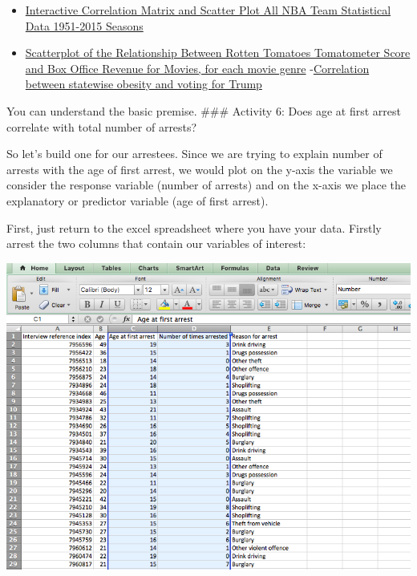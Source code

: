 \documentclass[]{book}
\providecommand{\tightlist}{%
  \setlength{\itemsep}{0pt}\setlength{\parskip}{0pt}}
\theoremstyle{definition}
\theoremstyle{definition}
\theoremstyle{definition}
\theoremstyle{remark}
\begin{document}
\begin{itemize}
\tightlist
\item
  \href{http://asbcllc.com/blog/2014/december/nba_team_corr_matrix/scaled/}{Interactive
  Correlation Matrix and Scatter Plot All NBA Team Statistical Data
  1951-2015 Seasons}
\item
  \href{http://rebrn.com/re/relationship-between-rotten-tomatoes-tomatometer-score-and-box-o-2558335/}{Scatterplot
  of the Relationship Between Rotten Tomatoes Tomatometer Score and Box
  Office Revenue for Movies, for each movie genre}
  -\href{https://fsmedia.imgix.net/af/f3/d7/f5/b2df/470f/8f8c/4b41daf55348/the-correlation-between-trump-voters-and-obesity-has-a-strong-positive-correlation-at-0717.png?auto=format\%2Ccompress\&w=700}{Correlation
  between statewise obesity and voting for Trump}
\end{itemize}

You can understand the basic premise. \#\#\# Activity 6: Does age at
first arrest correlate with total number of arrests?

 So let's build one for our arrestees. Since we are trying to explain
number of arrests with the age of first arrest, we would plot on the
y-axis the variable we consider the response variable (number of
arrests) and on the x-axis we place the explanatory or predictor
variable (age of first arrest).

First, just return to the excel spreadsheet where you have your data.
Firstly arrest the two columns that contain our variables of interest:

\includegraphics{imgs/scatter_1.png}
\end{document}
